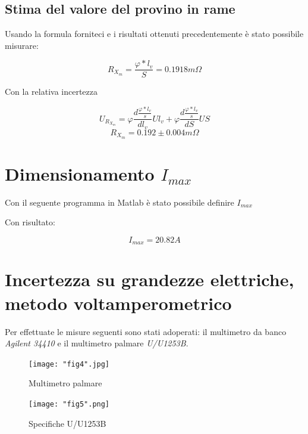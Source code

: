 \documentclass[a4paper]{article}
\begin{document}
\subsection{Stima del valore del provino in rame}
Usando la formula forniteci e i risultati ottenuti precedentemente è stato possibile misurare:
\begin{Large}
	\begin{equation}
		R_{X_{m}} =\frac{\varphi*l_v}{S}= 0.1918 m\Omega
	 \end{equation}
\end{Large}
Con la relativa incertezza
\begin{Large}
	\begin{equation}
		U_{R_{X_{m}}} = \varphi\frac{d\frac{\varphi*l_v}{s}}{dl_v}U{l_v}+\varphi\frac{d\frac{\varphi*l_v}{s}}{dS}U{S}
	 \end{equation}
	 \begin{equation}
		R_{X_{m}} =0.192\pm 0.004 m \Omega
	 \end{equation}
\end{Large}


\section{Dimensionamento $I_{max}$}
Con il seguente programma in Matlab è stato possibile definire $I_{max}$



Con risultato: 
\begin{Large}
	\begin{equation}
		I_{max} = 20.82 A
	 \end{equation}
\end{Large}


\section {Incertezza su grandezze elettriche, metodo voltamperometrico}
Per effettuate le misure seguenti sono stati adoperati: il multimetro da banco \emph{Agilent 34410} e il multimetro palmare \emph{U/U1253B}.
\begin{figure}[htp]
	\centering
	\texttt{[image: "fig4".jpg]}
	\caption{Multimetro palmare}
	\label{}
\end{figure}
\begin{figure}[htp]
	\centering
	\texttt{[image: "fig5".png]}
	\caption{Specifiche U/U1253B }
	\label{}
\end{figure}
\end{document}
